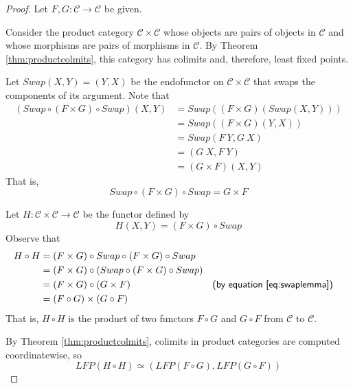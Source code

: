\documentclass{msthesis}
\theoremstyle{definition}
\newcommand{\mcC}{\mathcal{C}}
\begin{document}
\begin{proof}
Let $F,G :\mcC \to \mcC$ be given.

Consider the product category $\mcC \times \mcC$ whose objects are pairs of objects in $\mcC$ and whose morphisms are pairs of morphisms in $\mcC$. By Theorem \ref{thm:productcolmits}, this category has colimits and, therefore, least fixed points.

Let $Swap(X, Y) = (Y, X)$ be the endofunctor on $\mcC \times \mcC$ that swaps the components of its argument.
Note that 
 \begin{align*}
    (Swap \circ (F \times G) \circ Swap)(X, Y)
    &= Swap((F \times G)(Swap(X, Y))) \\
    &= Swap((F \times G)(Y, X))  \\
    &= Swap(F\ Y, G\ X) \\
    &= (G\ X, F\ Y) \\
    &= (G \times F) (X,Y)
\end{align*}
That is, 
\begin{equation} \label{eq:swaplemma}
Swap \circ (F \times G) \circ Swap = G \times F
\end{equation}

Let $H : \mcC \times \mcC \to \mcC$ be the functor defined by
    \[ H(X,Y) = (F \times G) \circ Swap \]
Observe that 
\begin{align*}
    H \circ H
    &= (F \times G) \circ Swap \circ (F \times G) \circ Swap \\
    &= (F \times G) \circ (Swap \circ (F \times G) \circ Swap) \\
    &= (F \times G) \circ (G \times F) && \textsf{(by equation \eqref{eq:swaplemma})}\\
    &= (F \circ G) \times (G \circ F)
\end{align*}
    That is, $H \circ H$ is the product of two functors $F \circ G$ and $G \circ F$ from $\mcC$ to $\mcC$.  
    
    By Theorem \ref{thm:productcolmits}, colimits in product categories are computed coordinatewise, so 
\begin{equation} \label{eq:HcircH}
     LFP(H \circ H) \simeq (LFP(F \circ G), LFP(G \circ F)) 
\end{equation}


\end{proof}
\end{document}
